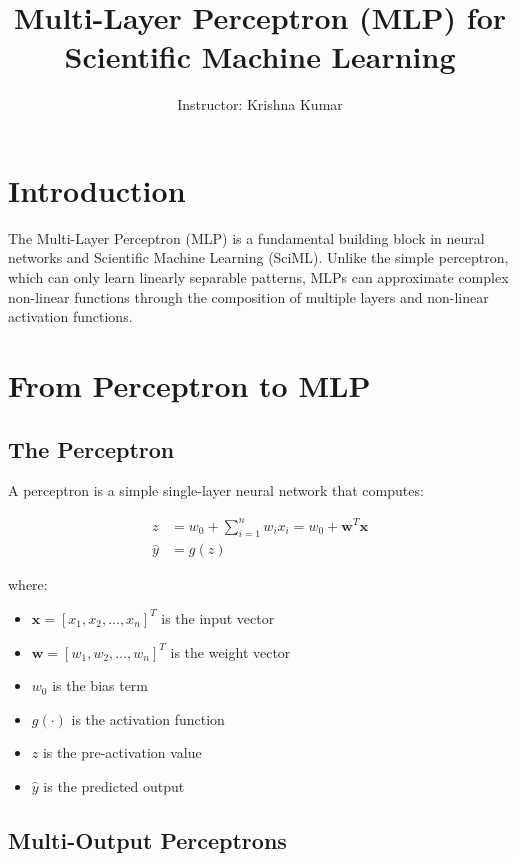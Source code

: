 \documentclass{article}
\title{Multi-Layer Perceptron (MLP) for Scientific Machine Learning}
\author{Instructor: Krishna Kumar}
\date{}
\begin{document}
\maketitle

\section{Introduction}

The Multi-Layer Perceptron (MLP) is a fundamental building block in neural networks and Scientific Machine Learning (SciML). Unlike the simple perceptron, which can only learn linearly separable patterns, MLPs can approximate complex non-linear functions through the composition of multiple layers and non-linear activation functions.

\section{From Perceptron to MLP}

\subsection{The Perceptron}

A perceptron is a simple single-layer neural network that computes:

\begin{align}
z &= w_0 + \sum_{i=1}^{n} w_i x_i = w_0 + \boldsymbol{w}^T\boldsymbol{x} \label{eq:perceptron_linear}\\
\hat{y} &= g(z) \label{eq:perceptron_activation}
\end{align}

where:
\begin{itemize}
    \item $\boldsymbol{x} = [x_1, x_2, \ldots, x_n]^T$ is the input vector
    \item $\boldsymbol{w} = [w_1, w_2, \ldots, w_n]^T$ is the weight vector
    \item $w_0$ is the bias term
    \item $g(\cdot)$ is the activation function
    \item $z$ is the pre-activation value
    \item $\hat{y}$ is the predicted output
\end{itemize}

\subsection{Multi-Output Perceptrons}
\end{document}
